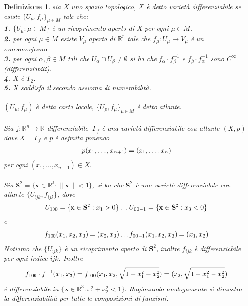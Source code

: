 \documentclass[oneside, 11pt]{amsbook}
\newcommand{\0}{{(0)}}
\newcommand{\3}{{(3)}}
\theoremstyle{colonplain}
\theoremstyle{colondefinition}
\newtheorem{defn}[thm]{Definizione}
\theoremstyle{colonremark}
\numberwithin{equation}{chapter}
\begin{document}
\begin{defn} sia $X$ uno spazio topologico, $X$ è detto \textit{varietà differenziabile} se esiste $\{ U_\mu, f_\mu \}_{\mu \in M}$ tale che: \\
\textbf{1.} $\{ U_\mu : \mu \in M \}$ è un ricoprimento aperto di $X$ per ogni $\mu \in M$. \\
\textbf{2.} per ogni $\mu \in M$ esiste $V_\mu$ aperto di $\mathbb{R}^n$ tale che $f_\mu : U_\mu \longrightarrow V_\mu$ è un omeomorfismo. \\
\textbf{3.} per ogni $\alpha, \beta \in M$ tali che $U_\alpha \cap U_\beta \neq \emptyset$ si ha che $f_\alpha \cdot f^{-1}_\beta$ e $f_\beta \cdot f^{-1}_\alpha$ sono $C^{\infty}$ (differenziabili). \\
\textbf{4.} $X$ è $T_2$. \\
\textbf{5.} $X$ soddisfa il secondo assioma di numerabilità. \\ \\
$(U_\mu, f_\mu)$ è detta \textit{carta locale}, $\{ U_\mu, f_\mu \}_{\mu \in M}$ è detto \textit{atlante}. \\ \\
Sia $f : \mathbb{R}^n \longrightarrow \mathbb{R}$ differenziabile, $\Gamma_f$ è una varietà differenziabile con atlante $(X, p)$ dove $X = \Gamma_f$ e $p$ è definita ponendo
\begin{align}
    p(x_1, \dots, x_{n + 1}) = (x_1, \dots, x_n) \notag
\end{align} 
per ogni $(x_1, \dots, x_{n + 1}) \in X$. \\ \\
Sia $\mathbf{S}^2 = \{ \mathbf{x} \in \mathbb{R}^3 : \| \mathbf{x} \| < 1 \}$, si ha che $\mathbf{S}^2$ è una varietà differenziabile con atlante $\{ U_{ijk}, f_{ijk} \}$, dove
\begin{align}
    U_{100} = \{ \mathbf{x} \in \mathbf{S}^2 : x_1 > 0 \} \dots U_{00-1} = \{ \mathbf{x} \in \mathbf{S}^2 : x_3 < 0 \} \notag
\end{align}
e
\begin{align}
    f_{100}(x_1, x_2, x_3) = (x_2, x_3) \dots f_{00-1}(x_1, x_2, x_3) = (x_1, x_2) \notag
\end{align}
Notiamo che $\{ U_{ijk} \}$ è un ricoprimento aperto di $\mathbf{S}^2$, inoltre $f_{ijk}$ è differenziabile per ogni indice $ijk$. Inoltre
\begin{align}
    f_{100} \cdot f^{-1}(x_1, x_2) = f_{100}(x_1, x_2, \sqrt{1 - x^2_1 - x^2_2}) = (x_2, \sqrt{1 - x^2_1 - x^2_2}) \notag
\end{align}
è differenziabile in $\{ \mathbf{x} \in \mathbb{R}^3 : x^2_1 + x^2_2 < 1 \}$. Ragionando analogamente si dimostra la differenziabilità per tutte le composizioni di funzioni. \\ \\
\end{defn}
\end{document}
